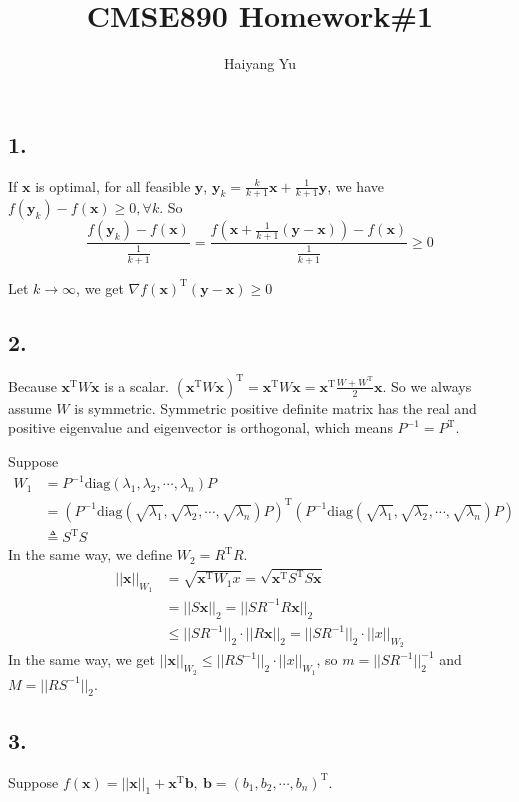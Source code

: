 \documentclass{article}
\title{CMSE890 Homework\#1}
\author{Haiyang Yu}
\begin{document}
\maketitle
\subsection*{1.}
If $\bm{x}$ is optimal, for all feasible $\bm{y}$, $\bm{y}_{k}=\frac{k}{k+1}\bm{x}+\frac{1}{k+1}\bm{y}$, we have $f(\bm{y}_{k})-f(\bm{x})\geq0,\forall k$.
So$$\frac{f(\bm{y}_{k})-f(\bm{x})}{\frac{1}{k+1}}=\frac{f(\bm{x}+\frac{1}{k+1}(\bm{y}-\bm{x}))-f(\bm{x})}{\frac{1}{k+1}}\geq0$$

Let $k\rightarrow \infty$, we get $\nabla f(\bm{x})^{\mathrm{T}}(\bm{y}-\bm{x})\geq0$

\subsection*{2.}

Because $\bm{x}^{\mathrm{T}}W\bm{x}$ is a scalar. $(\bm{x}^{\mathrm{T}}W\bm{x})^{\mathrm{T}}=\bm{x}^{\mathrm{T}}W\bm{x}=\bm{x}^{\mathrm{T}}\frac{W+W^{\mathrm{T}}}{2}\bm{x}$. So we always assume $W$ is symmetric. Symmetric positive definite matrix has the real and positive eigenvalue and eigenvector is orthogonal, which means $P^{-1}=P^{\mathrm{T}}$.

Suppose
\begin{align*}
W_{1}&=P^{-1}\mathrm{diag}(\lambda_{1},\lambda_{2},\cdots,\lambda_{n})P \\
&=(P^{-1}\mathrm{diag}(\sqrt{\lambda_{1}},\sqrt{\lambda_{2}},\cdots,\sqrt{\lambda_{n}})P)^{\mathrm{T}}(P^{-1}\mathrm{diag}(\sqrt{\lambda_{1}},\sqrt{\lambda_{2}},\cdots,\sqrt{\lambda_{n}})P)\\
&\triangleq S^{\mathrm{T}}S
\end{align*}
In the same way, we define $W_{2}=R^{\mathrm{T}}R$.
\begin{align*}
||\bm{x}||_{W_{1}}&=\sqrt{\bm{x}^{\mathrm{T}}W_{1}x}=\sqrt{\bm{x}^{\mathrm{T}}S^{\mathrm{T}}S\bm{x}}\\
&=||S\bm{x}||_{2}=||SR^{-1}R\bm{x}||_{2}\\
&\leq||SR^{-1}||_{2}\cdot||R\bm{x}||_{2}=||SR^{-1}||_{2}\cdot||x||_{W_{2}}
\end{align*}
In the same way, we get $||\bm{x}||_{W_{2}}\leq||RS^{-1}||_{2}\cdot||x||_{W_{1}}$, so $m=||SR^{-1}||_{2}^{-1}$ and $M=||RS^{-1}||_{2}$.
\subsection*{3.}
Suppose $f(\bm{x})=||\bm{x}||_{1}+\bm{x}^{\mathrm{T}}\bm{b},\ \bm{b}=(b_{1},b_{2},\cdots,b_{n})^{\mathrm{T}}$.
\end{document}
